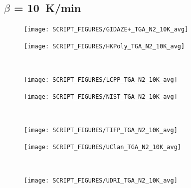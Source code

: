 \documentclass{book}
\begin{document}
\begin{landscape}
\subsection{$\beta$ = 10~K/min}
\begin{minipage}{0.65\textwidth}
\begin{figure}[H]
{\texttt{[image: SCRIPT\_FIGURES/GIDAZE+\_TGA\_N2\_10K\_avg]}}\\
\end{figure}
\end{minipage} 
\begin{minipage}{0.35\textwidth}
\begin{figure}[H]
{\texttt{[image: SCRIPT\_FIGURES/HKPoly\_TGA\_N2\_10K\_avg]}}\\
\end{figure}
\end{minipage}\\
\begin{minipage}{0.65\textwidth}
\begin{figure}[H]
{\texttt{[image: SCRIPT\_FIGURES/LCPP\_TGA\_N2\_10K\_avg]}}\\
\end{figure}
\end{minipage} 
\begin{minipage}{0.35\textwidth}
\begin{figure}[H]
{\texttt{[image: SCRIPT\_FIGURES/NIST\_TGA\_N2\_10K\_avg]}}\\
\end{figure}
\end{minipage}\\
\begin{minipage}{0.65\textwidth}
\begin{figure}[H]
{\texttt{[image: SCRIPT\_FIGURES/TIFP\_TGA\_N2\_10K\_avg]}}\\
\end{figure}
\end{minipage} 
\begin{minipage}{0.35\textwidth}
\begin{figure}[H]
{\texttt{[image: SCRIPT\_FIGURES/UClan\_TGA\_N2\_10K\_avg]}}\\
\end{figure}
\end{minipage}\\
\begin{minipage}{0.65\textwidth}
\begin{figure}[H]
{\texttt{[image: SCRIPT\_FIGURES/UDRI\_TGA\_N2\_10K\_avg]}}\\

\end{figure}
\end{minipage}
\end{landscape}
\end{document}
